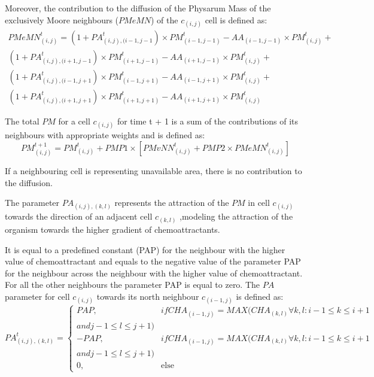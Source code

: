 Moreover, the contribution to the diffusion of the Physarum Mass of the exclusively Moore neighbours ($PMeMN$) of the $c_{(i,j)}$ cell is defined as:
\begin{equation}
\begin{split}
PMeMN^t_{(i, j)} = 
(1 + PA^t_{(i, j),(i-1, j-1}) \times PM^t_{(i-1, j-1)} - AA_{(i-1, j-1)} \times PM^t_{(i, j)} +
\\(1 + PA^t_{(i, j),(i+1, j-1}) \times PM^t_{(i+1, j-1)} - AA_{(i+1, j-1)} \times PM^t_{(i, j)} +
\\(1 + PA^t_{(i, j),(i-1, j+1}) \times PM^t_{(i-1, j+1)} - AA_{(i-1, j+1)} \times PM^t_{(i, j)}  +
\\(1 + PA^t_{(i, j),(i+1, j+1}) \times PM^t_{(i+1, j+1)} - AA_{(i+1, j+1)} \times PM^t_{(i, j)}
\end{split}
\end{equation}

The total $PM$ for a cell $c_{(i,j)}$ for time t + 1 is a sum of the contributions of its neighbours with appropriate weights and is defined as:
\begin{equation}
PM^{t+1}_{(i, j)} = PM^t_{(i, j)} + PMP1 \times [PMvNN^t_{(i, j)} + PMP2 \times PMeMN^t_{(i, j)}]
\end{equation}

If a neighbouring cell is representing unavailable area, there is no contribution to the diffusion. 
\par
The parameter $PA_{(i, j),(k,l)}$ represents the attraction of the $PM$ in cell $c_{(i,j)}$ towards the direction of an adjacent cell $c_{(k,l)}$ ,modeling the attraction of the organism towards the higher gradient of chemoattractants. 
\par
It is equal to a predefined constant (PAP) for the neighbour with the higher value of chemoattractant and equals to the negative value of the parameter PAP for the neighbour across the neighbour with the higher value of chemoattractant. For all the other neighbours the parameter PAP is equal to zero. The $PA$ parameter for cell $c_{(i,j)}$ towards its north neighbour $c_{(i-1,j)}$ is defined as:
\begin{equation}
PA^t_{(i, j),(k,l)}=
\begin{cases} 
PAP, & if CHA_{(i-1, j)} = MAX(CHA_{(k, l)} \forall k, l: i - 1 \leq k \leq i + 1 \\and j - 1 \leq l \leq j+1) \\ 
- PAP, & if CHA_{(i-1, j)} = MAX(CHA_{(k, l)} \forall k, l: i - 1 \leq k \leq i + 1 \\and j - 1 \leq l \leq j+1) \\ 
0, & \mbox{else}
\end{cases}
\end{equation}

